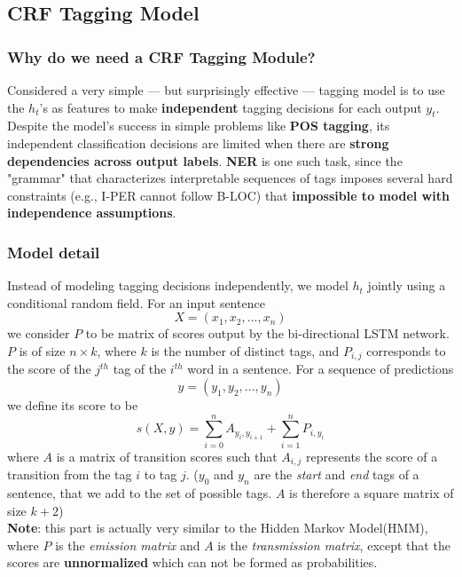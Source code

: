 \documentclass[a3paper, 12pt]{book} %
\begin{document}
\subsection{CRF Tagging Model}
\subsubsection{Why do we need a CRF Tagging Module?}
Considered a very simple --- but surprisingly effective --- tagging model is to use the $h_t$'s as features to make \textbf{independent} tagging decisions for each output $y_t$. Despite the model's success in simple problems like \textbf{POS tagging}, its independent classification decisions are limited when there are \textbf{strong dependencies across output labels}. \textbf{NER} is one such task, since the "grammar" that characterizes interpretable sequences of tags imposes several hard constraints (e.g., I-PER cannot follow B-LOC) that \textbf{impossible to model with independence assumptions}.

\subsubsection{Model detail}
Instead of modeling tagging decisions independently, we model $h_t$ jointly using a conditional random field. For an input sentence 
$$X=(x_1, x_2,...,x_n)$$
we consider $P$ to be matrix of scores output by the bi-directional LSTM network. $P$ is of size $n\times k$, where $k$ is the number of distinct tags, and $P_{i,j}$ corresponds to the score of the $j^{th}$ tag of the $i^{th}$ word in a sentence. For a sequence of predictions 
$$y=(y_1,y_2,...,y_n)$$
we define its score to be 
\begin{equation}
s(X,y)=\sum_{i=0}^{n}{A_{y_i,y_{i+1}}}+\sum_{i=1}^{n}{P_{i,y_i}}
\end{equation}
where $A$ is a matrix of transition scores such that $A_{i,j}$ represents the score of a transition from the tag $i$ to tag $j$. ($y_0$ and $y_n$ are the \emph{start} and \emph{end} tags of a sentence, that we add to the set of possible tags. $A$ is therefore a square matrix of size $k+2$) \\

\textbf{Note}: this part is actually very similar to the Hidden Markov Model(HMM), where $P$ is the \emph{emission matrix} and $A$ is the \emph{transmission matrix}, except that the scores are \textbf{unnormalized} which can not be formed as probabilities. \\
\end{document}
